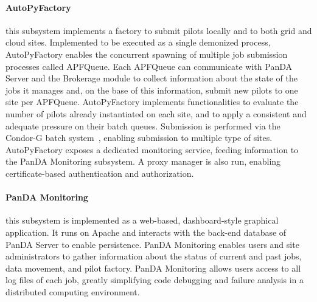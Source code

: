 \paragraph{\textbf{AutoPyFactory}} this subsystem implements a factory to submit
pilots locally and to both grid and cloud sites. Implemented to be executed as a
single demonized process, AutoPyFactory enables the concurrent spawning of
multiple job submission processes called APFQueue. Each APFQueue can communicate
with PanDA Server and the Brokerage module to collect information about the
state of the jobs it manages and, on the base of this information, submit new
pilots to one site per APFQueue. AutoPyFactory implements functionalities to
evaluate the number of pilots already instantiated on each site, and to apply a
consistent and adequate pressure on their batch queues. Submission is performed
via the Condor-G batch system~\cite{condorg}, enabling submission to multiple
type of sites. AutoPyFactory exposes a dedicated monitoring service, feeding
information to the PanDA Monitoring subsystem. A proxy manager is also run,
enabling certificate-based authentication and authorization.


\paragraph{\textbf{PanDA Monitoring}} this subsystem is implemented as a
web-based, dashboard-style graphical application. It runs on Apache and
interacts with the back-end database of PanDA Server to enable persistence.
PanDA Monitoring enables users and site administrators to gather information
about the status of current and past jobs, data movement, and pilot factory.
PanDA Monitoring allows users access to all log files of each job, greatly
simplifying code debugging and failure analysis in a distributed computing
environment.

